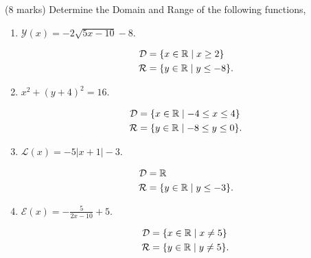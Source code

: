 \documentclass[12pt]{article} %
\begin{document}
\newpage

\begin{qstn}
  (8 marks) Determine the Domain and Range of the following functions,
  \begin{enumerate}[label=(\alph*)]
    \item $\mathcal{Y}(x) = -2\sqrt{5x - 10} - 8$.
      \begin{solution}
      \begin{align*}
        \mathcal{D} &= \{x \in \mathbb R \mid x \geq 2\}\\
        \mathcal{R} &= \{y \in \mathbb R \mid y \leq -8\} 
      .\end{align*}
        
      \end{solution}

      \vspace*{2cm}

    \item $x^2 + (y + 4)^2 = 16$.
      \begin{solution}
      \begin{align*}
        \mathcal{D} &= \{x \in \mathbb R \mid -4 \leq x \leq 4\}\\
        \mathcal{R} &= \{y \in \mathbb R \mid -8 \leq y \leq 0\} 
      .\end{align*}
        
      \end{solution}
    
      \vspace*{2cm}


    \item $\mathcal{L}(x) = -5\left|x + 1\right| - 3$.
      \begin{solution}
      \begin{align*}
        \mathcal{D} &= \mathbb R \\
        \mathcal{R} &= \{y \in \mathbb R \mid y \leq -3\} 
      .\end{align*}
        
      \end{solution}
    
      \vspace*{2cm}

    \item $\mathcal{E}(x) = -\frac{5}{2x - 10} + 5$.
      \begin{solution}
      \begin{align*}
        \mathcal{D} &= \{x \in \mathbb R \mid x \neq 5\}\\
        \mathcal{R} &= \{y \in \mathbb R \mid y \neq 5 \} 
      .\end{align*}
        
      \end{solution}
  \end{enumerate}
\end{qstn}
\end{document}
